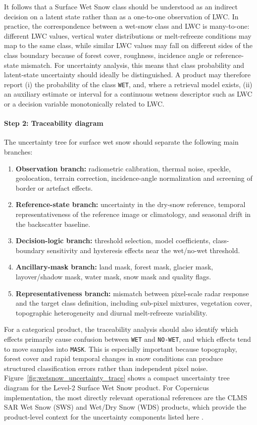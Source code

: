 \noindent It follows that a Surface Wet Snow class should be understood as an indirect
decision on a latent state rather than as a one-to-one observation of LWC. In
practice, the correspondence between a wet-snow class and LWC is many-to-one:
different LWC values, vertical water distributions or melt-refreeze conditions
may map to the same class, while similar LWC values may fall on different sides
of the class boundary because of forest cover, roughness, incidence angle or
reference-state mismatch. For uncertainty analysis, this means that class
probability and latent-state uncertainty should ideally be distinguished. A
product may therefore report (i) the probability of the class \texttt{WET}, and,
where a retrieval model exists, (ii) an auxiliary estimate or interval for a
continuous wetness descriptor such as LWC or a decision variable monotonically
related to LWC.


\paragraph{Step 2: Traceability diagram}

The uncertainty tree for surface wet snow should separate the following main
branches:
\begin{enumerate}
  \item \textbf{Observation branch:} radiometric calibration, thermal noise,
  speckle, geolocation, terrain correction, incidence-angle normalization and
  screening of border or artefact effects.
  \item \textbf{Reference-state branch:} uncertainty in the dry-snow reference,
  temporal representativeness of the reference image or climatology, and
  seasonal drift in the backscatter baseline.
  \item \textbf{Decision-logic branch:} threshold selection, model coefficients,
  class-boundary sensitivity and hysteresis effects near the wet/no-wet
  threshold.
  \item \textbf{Ancillary-mask branch:} land mask, forest mask, glacier mask,
  layover/shadow mask, water mask, snow mask and quality flags.
  \item \textbf{Representativeness branch:} mismatch between pixel-scale radar
  response and the target class definition, including sub-pixel mixtures,
  vegetation cover, topographic heterogeneity and diurnal melt-refreeze
  variability.
\end{enumerate}

\noindent For a categorical product, the traceability analysis should also identify
which effects primarily cause confusion between \texttt{WET} and
\texttt{NO-WET}, and which effects tend to move samples into \texttt{MASK}.
This is especially important because topography, forest cover and rapid temporal
changes in snow conditions can produce structured classification errors rather
than independent pixel noise. Figure~\ref{fig:wetsnow_uncertainty_trace} shows a
compact uncertainty tree diagram for the Level-2 Surface Wet Snow product. For
Copernicus implementation, the most directly relevant operational references
are the CLMS SAR Wet Snow (SWS) and Wet/Dry Snow (WDS) products, which provide
the product-level context for the uncertainty components listed here
\cite{clms_sws,clms_wds}.

